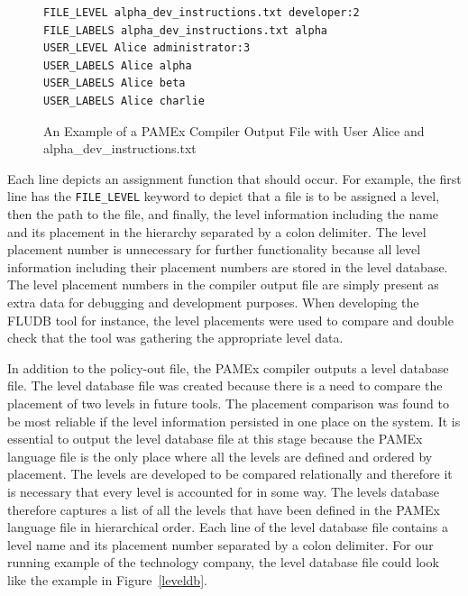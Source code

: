 \begin{figure}[htb]
    \centering
    \begin{tcolorbox}[width=.8\textwidth, boxsep=5pt, sharp corners, colback=white, colframe=black, fontupper=\footnotesize\ttfamily] %
        \begin{minipage}{\textwidth} %
            \begin{lstlisting}
FILE_LEVEL alpha_dev_instructions.txt developer:2 
FILE_LABELS alpha_dev_instructions.txt alpha 
USER_LEVEL Alice administrator:3 
USER_LABELS Alice alpha 
USER_LABELS Alice beta 
USER_LABELS Alice charlie 
            \end{lstlisting}
        \end{minipage}
    \end{tcolorbox}
    \caption[PAMEx Compiler Output File Example]{\label{compout}An Example of a PAMEx Compiler Output File with User Alice and alpha\_dev\_instructions.txt}
\end{figure}

Each line depicts an assignment function that should occur. For example,
the first line has the \texttt{FILE\_LEVEL} keyword to depict that a file is to 
be assigned a level, then the path to the file, and finally, the level 
information including the name and its placement in the hierarchy 
separated by a colon delimiter. The level placement number is 
unnecessary for further functionality because all level information 
including their placement numbers are stored in the level database. 
The level placement numbers in the compiler output file are 
simply present as extra data for debugging and development purposes. 
When developing the FLUDB tool for instance, the level placements 
were used to compare and double check that the tool was gathering the 
appropriate level data. 

In addition to the policy-out file, the PAMEx compiler outputs a level 
database file. The level database file was created because there is a 
need to compare the placement of two levels in future tools. The 
placement comparison was found to be most reliable if the level 
information persisted in one place on the system. It is essential to output the level database file at this 
stage because the PAMEx language file is the only place where all the 
levels are defined and ordered by placement. The levels are developed 
to be compared relationally and therefore it is necessary that every 
level is accounted for in some way. The levels database therefore 
captures a list of all the levels that have been defined in the PAMEx 
language file in hierarchical order. Each line of the level database 
file contains a level name and its placement number separated by a 
colon delimiter. For our running example of the technology company, the level database file could look like 
the example in Figure~\ref{leveldb}.
\clearpage

